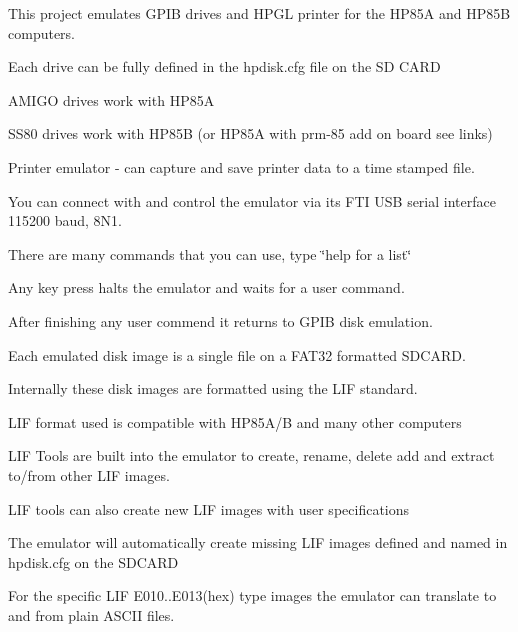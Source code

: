 \begin{DoxyItemize}
\item This project emulates G\+P\+IB drives and H\+P\+GL printer for the H\+P85A and H\+P85B computers.
\begin{DoxyItemize}
\item Each drive can be fully defined in the hpdisk.\+cfg file on the SD C\+A\+RD
\item A\+M\+I\+GO drives work with H\+P85A
\item S\+S80 drives work with H\+P85B (or H\+P85A with prm-\/85 add on board see links)
\item Printer emulator -\/ can capture and save printer data to a time stamped file.
\item You can connect with and control the emulator via its F\+TI U\+SB serial interface 115200 baud, 8\+N1.
\begin{DoxyItemize}
\item There are many commands that you can use, type \char`\"{}help for a list\char`\"{}
\item Any key press halts the emulator and waits for a user command.
\item After finishing any user commend it returns to G\+P\+IB disk emulation.
\end{DoxyItemize}
\item Each emulated disk image is a single file on a F\+A\+T32 formatted S\+D\+C\+A\+RD.
\begin{DoxyItemize}
\item Internally these disk images are formatted using the L\+IF standard.
\begin{DoxyItemize}
\item L\+IF format used is compatible with H\+P85\+A/B and many other computers
\end{DoxyItemize}
\item L\+IF Tools are built into the emulator to create, rename, delete add and extract to/from other L\+IF images.
\begin{DoxyItemize}
\item L\+IF tools can also create new L\+IF images with user specifications
\end{DoxyItemize}
\item The emulator will automatically create missing L\+IF images defined and named in hpdisk.\+cfg on the S\+D\+C\+A\+RD
\item For the specific L\+IF E010..E013(hex) type images the emulator can translate to and from plain A\+S\+C\+II files.

\end{DoxyItemize}
\end{DoxyItemize}
\end{DoxyItemize}
